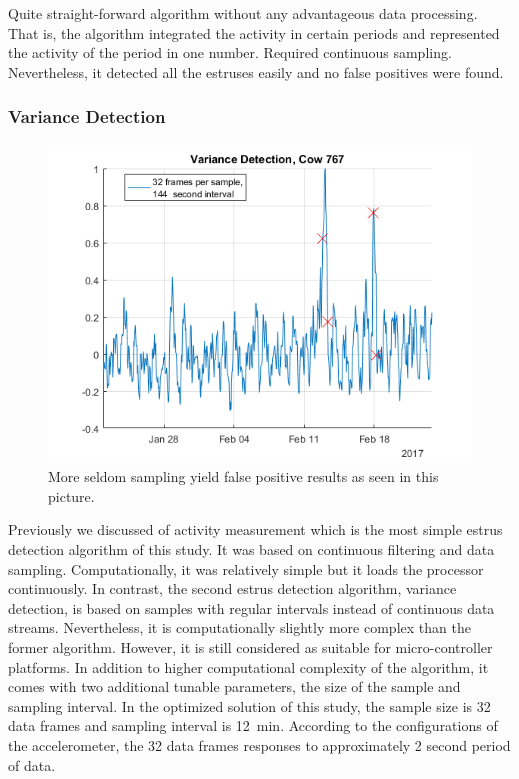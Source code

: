 \documentclass[english,12pt,a4paper,pdftex,elec,utf8]{aaltothesis}
\begin{document}
Quite straight-forward algorithm without any advantageous data processing. That is, the algorithm integrated the activity in certain periods and represented the activity of the period in one number. Required continuous sampling. Nevertheless, it detected all the estruses easily and no false positives were found.


\subsubsection{Variance Detection} \label{variancedetectionevaluation}

\begin{figure}[htb]
\centering
\includegraphics[width = 0.75 \textwidth]{figures/VarianceDetectionCow767_32frames144seconds.png}
\caption{More seldom sampling yield false positive results as seen in this picture.}
\label{VarianceDetectionCow767_32frames144seconds}
\end{figure}


Previously we discussed of activity measurement which is the most simple estrus detection algorithm of this study. It was based on continuous filtering and data sampling. Computationally, it was relatively simple but it loads the processor continuously. In contrast, the second estrus detection algorithm, variance detection, is based on samples with regular intervals instead of continuous data streams. Nevertheless, it is computationally slightly more complex than the former algorithm. However, it is still considered as suitable for micro-controller platforms. In addition to higher computational complexity of the algorithm, it comes with two additional tunable parameters, the size of the sample and sampling interval. In the optimized solution of this study, the sample size is 32 data frames and sampling interval is \SI{12}{\minute}. According to the configurations of the accelerometer, the 32 data frames responses to approximately 2 second period of data. 
\end{document}
